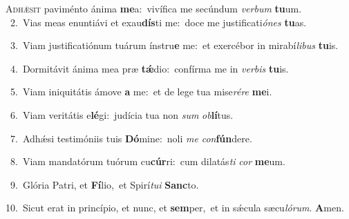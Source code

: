 \lettrine{\initial\textcolor{\initialcolor}{A}}{dhǽsit} paviménto ánima \textbf{me}\-a:~\star vivífica me secúndum \textit{ver}\-\textit{bum} \textbf{tu}\-um.\\
{\numbfont\textcolor{\numbcolor}{~2.}}~Vias meas enuntiávi et exau\-\textbf{dís}\-ti me:~\star doce me justificati\-\textit{ó}\-\textit{nes} \textbf{tu}\-as.\par
{\numbfont\textcolor{\numbcolor}{~3.}}~Viam justificatiónum tuárum ínstru\textbf{e} me:~\star et exercébor in mirabí\-\textit{li}\-\textit{bus} \textbf{tu}\-is.\par
{\numbfont\textcolor{\numbcolor}{~4.}}~Dormitávit ánima mea præ \textbf{tǽ}\-dio:~\star confírma me in \textit{ver}\-\textit{bis} \textbf{tu}\-is.\par
{\numbfont\textcolor{\numbcolor}{~5.}}~Viam iniquitátis ámove \textbf{a} me:~\star et de lege tua mise\-\textit{ré}\-\textit{re} \textbf{me}\-i.\par
{\numbfont\textcolor{\numbcolor}{~6.}}~Viam veritátis e\-\textbf{lé}\-gi:~\star judícia tua non \textit{sum} \textit{ob}\-\textbf{lí}tus.\par
{\numbfont\textcolor{\numbcolor}{~7.}}~Adhǽsi testimóniis tuis \textbf{Dó}\-mine:~\star noli \textit{me} \textit{con}\-\textbf{fún}dere.\par
{\numbfont\textcolor{\numbcolor}{~8.}}~Viam mandatórum tuórum cu\-\textbf{cúr}\-ri:~\star cum dilatás\textit{ti} \textit{cor} \textbf{me}\-um.\par
{\numbfont\textcolor{\numbcolor}{~9.}}~Glória Patri, et \textbf{Fí}\-lio,~\star et Spirí\-\textit{tu}\-\textit{i} \textbf{Sanc}\-to.\par
{\numbfont\textcolor{\numbcolor}{10.}}~Sicut erat in princípio, et nunc, et \textbf{sem}\-per,~\star et in sǽcula sæcu\-\textit{ló}\-\textit{rum}. \textbf{A}\-men.\par
